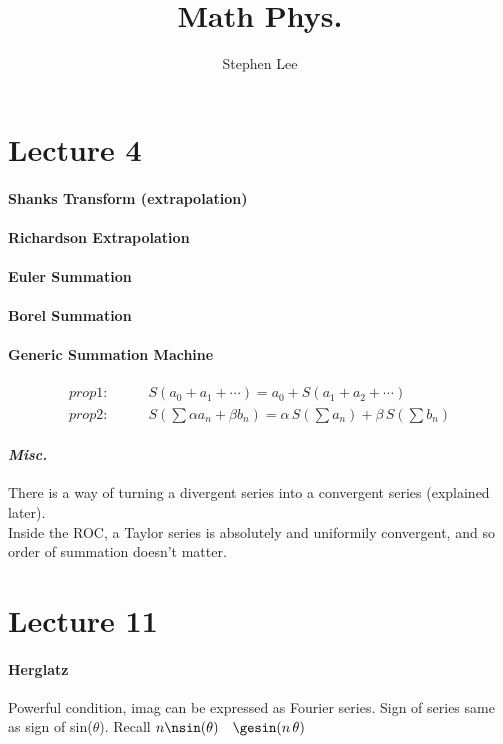 \documentclass{article}
\author{Stephen Lee}
\title{Math Phys.}
\begin{document}
\maketitle

\section[4]{Lecture 4}

\paragraph{Shanks Transform (extrapolation)}
\paragraph{Richardson Extrapolation}


\paragraph{Euler Summation}


\paragraph{Borel Summation}

\paragraph{Generic Summation Machine}
\begin{align*} 
prop 1: & \qquad
S(a_0 + a_1 + \cdots) = a_0 + S(a_1 + a_2 + \cdots) \\
prop 2: & \qquad
S(\sum{\alpha a_n + \beta b_n}) = \alpha\,S(\sum{a_n}) + \beta\,S(\sum{b_n})
\end{align*}

\paragraph{\emph{Misc.}} 
There is a way of turning a divergent series into a convergent series (explained later). \\

Inside the ROC, a Taylor series is absolutely and uniformily convergent, and so order of summation doesn't matter.

\section{Lecture 11}
\paragraph{Herglatz}
Powerful condition, imag can be expressed as Fourier series. Sign of series same as sign of sin($\theta$). Recall $n\nsin(\theta)\quad\gesin(n\,\theta)$ 
\end{document}
